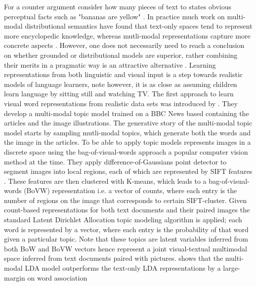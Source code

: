 For a counter argument consider how many pieces of text to states obvious perceptual facts such as "bananas are yellow"
\cite{bruni2014multimodal}.
In practice much work on multi-modal distributional semantics have found that text-only spaces tend to
represent more encyclopedic knowledge, whereas mutli-modal representations capture more concrete aspects
\cite{andrews2009integrating,baroni2008concepts}. However, one does not necessarily need to
reach a conclusion on whether grounded or distributional models are superior, rather combining their merits in a
pragmatic way is an attractive alternative \cite{riordan2011redundancy}. Learning representations
from both linguistic and visual input is a step towards realistic models of language learners, note however,
it is as close as assuming children
learn language by sitting still and watching TV.
The first approach to learn visual word representations from realistic data sets was introduced by \cite{feng2010visual}.
They develop a multi-modal topic model trained on a BBC News based containing the articles and the image illustrations.
The generative story of the multi-modal topic model starts by sampling mutli-modal topics, which generate both the
words and the image in the articles. To be able to apply topic models \cite{feng2010visual} represents images
in a discrete space using the bag-of-visual-words approach \cite{csurka2004visual}
a popular computer vision method at the time. They apply difference-of-Gaussians point detector to segment images
into local regions, each of which are represented by SIFT features \cite{lowe1999object}.
These features are then clustered with K-means, which leads to a bag-of-visual-words (BoVW) representation i.e.
a vector of counts, where each entry is the number of regions on the image that corresponds to certain SIFT-cluster.
Given count-based representations for both text documents and their paired images the standard Latent Dirichlet Allocation
topic modeling algorithm is applied; each word is represented by a vector, where each entry is the probability of that
word given a particular topic. Note that these topics are latent variables inferred from both BoW and BoVW vectors
hence represent a joint visual-textual multimodal space inferred from text documents paired with pictures. \cite{feng2010visual}
shows that the multi-modal LDA model outperforms the text-only LDA representations by a large-margin on word association
